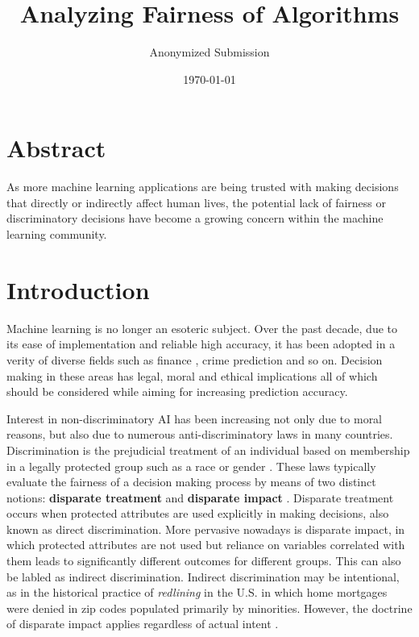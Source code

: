 \documentclass[11pt]{article}
\begin{document}
\title{Analyzing Fairness of Algorithms}
\author{Anonymized Submission}
\date{\today}
\maketitle

\section{Abstract}
As more machine learning applications are being trusted with making decisions that directly or indirectly affect human lives, the potential lack of fairness or discriminatory decisions have become a growing concern within the machine learning community.

\section{Introduction}
Machine learning is no longer an esoteric subject. Over the past decade, due to its ease of implementation and reliable high accuracy, it has been adopted in a verity of diverse fields such as finance  \cite{huang2007credit, tsai2008using, galindo2000credit}, crime prediction \cite{brennan2009evaluating} and so on. Decision making in these areas has legal, moral and ethical implications all of which should be considered while aiming for increasing prediction accuracy.

Interest in non-discriminatory AI has been increasing not only due to moral reasons, but also due to numerous anti-discriminatory laws in many countries. Discrimination is the prejudicial treatment of an individual based on membership in a legally protected group such as a race or gender \cite{calmon2017optimized}. These laws typically evaluate the fairness of a decision making process by means of two distinct notions: \textbf{disparate treatment} and \textbf{disparate impact} \cite{zafar2017fairness}. Disparate treatment occurs when protected attributes are used explicitly in making decisions, also known as direct discrimination. More pervasive nowadays is disparate impact, in which protected attributes are not used but reliance on variables correlated with them leads to significantly different outcomes for different groups. This can also be labled as indirect discrimination. Indirect discrimination may be intentional, as in the historical practice of \textit{redlining} in the U.S. in which home mortgages were denied in zip codes populated primarily by minorities. However, the doctrine of disparate impact applies regardless of actual intent \cite{calmon2017optimized}.
\end{document}
